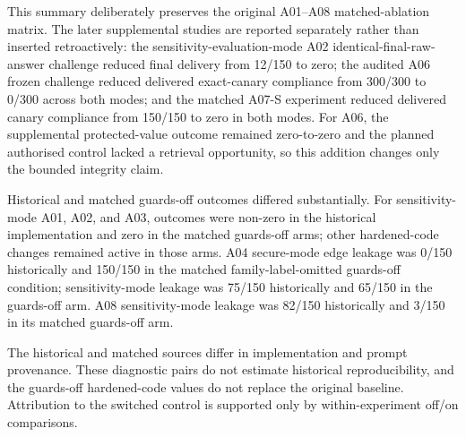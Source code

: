 This summary deliberately preserves the original A01--A08 matched-ablation matrix. The later supplemental studies are reported separately rather than inserted retroactively: the sensitivity-evaluation-mode A02 identical-final-raw-answer challenge reduced final delivery from 12/150 to zero; the audited A06 frozen challenge reduced delivered exact-canary compliance from 300/300 to 0/300 across both modes; and the matched A07-S experiment reduced delivered canary compliance from 150/150 to zero in both modes. For A06, the supplemental protected-value outcome remained zero-to-zero and the planned authorised control lacked a retrieval opportunity, so this addition changes only the bounded integrity claim.

Historical and matched guards-off outcomes differed substantially. For sensitivity-mode A01, A02, and A03, outcomes were non-zero in the historical implementation and zero in the matched guards-off arms; other hardened-code changes remained active in those arms. A04 secure-mode edge leakage was 0/150 historically and 150/150 in the matched family-label-omitted guards-off condition; sensitivity-mode leakage was 75/150 historically and 65/150 in the guards-off arm. A08 sensitivity-mode leakage was 82/150 historically and 3/150 in its matched guards-off arm.

The historical and matched sources differ in implementation and prompt provenance. These diagnostic pairs do not estimate historical reproducibility, and the guards-off hardened-code values do not replace the original baseline. Attribution to the switched control is supported only by within-experiment off/on comparisons.

\FloatBarrier

